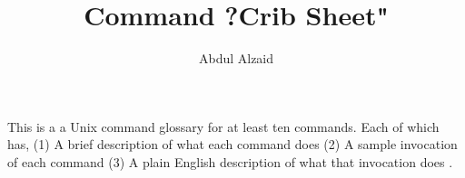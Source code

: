 \documentclass[12pt, oneside]{article}   	%
\title{Command ?Crib Sheet"}
\author{Abdul Alzaid}
\begin{document}
\maketitle
This is a a Unix command glossary for at least ten commands. Each of which has, (1) A brief description of what each command does (2) A sample invocation of each command (3) A plain English description of what that invocation does .
\end{document}
